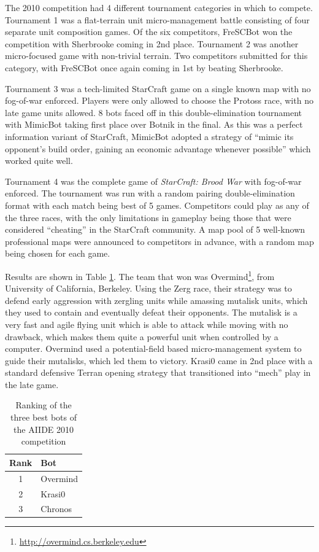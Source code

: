 \documentclass{llncs}
\begin{document}
The 2010 competition had 4 different tournament categories in which to compete. Tournament 1
was a flat-terrain unit micro-management battle consisting of four separate unit
composition games. Of the six competitors, FreSCBot won the competition with
Sherbrooke coming in 2nd place. Tournament 2 was another micro-focused game with
non-trivial terrain. Two competitors submitted for this category, with FreSCBot
once again coming in 1st by beating Sherbrooke.

Tournament 3 was a tech-limited StarCraft game on a single known map with no fog-of-war enforced. Players
were only allowed to choose the Protoss race, with no late game units allowed. 8 bots
faced off in this double-elimination tournament with MimicBot taking first place over Botnik in the final.
As this was a perfect information variant of StarCraft, MimicBot adopted a strategy of
``mimic its opponent's build order, gaining an economic advantage whenever possible'' which
worked quite well.

Tournament 4 was the complete game of {\em StarCraft: Brood War} with fog-of-war enforced. The tournament
was run with a random pairing double-elimination format with each match being best of 5 games.
Competitors could play as any of the three races, with the only limitations in gameplay
being those that were considered ``cheating'' in the StarCraft community. A map pool of
5 well-known professional maps were announced to competitors in advance, with a random map being chosen for each game.

Results are shown in Table \ref{tab:aiide2010}. The team that won was Overmind\footnote{\url{http://overmind.cs.berkeley.edu}}, from University of California, Berkeley. Using the Zerg race, their
strategy was to defend early aggression with zergling units while amassing mutalisk units,
which they used to contain and eventually defeat their opponents. The mutalisk is a very fast and agile
flying unit which is able to attack while moving with no drawback, which makes them quite a powerful
unit when controlled by a computer. Overmind used a potential-field
based micro-management system to guide their mutalisks, which led them to victory. Krasi0 came in 2nd place
with a standard defensive Terran opening strategy that transitioned into ``mech'' play in the late game.

\begin{table}[!t]
\caption{Ranking of the three best bots of the AIIDE 2010 competition}
\label{tab:aiide2010}
\centering
\begin{tabular}{|c|l|}
\hline
{\bfseries Rank} & {\bfseries Bot}\\
\hline
1 & Overmind \\
2 & Krasi0 \\
3 & Chronos \\
\hline
\end{tabular}
\end{table}
\end{document}
